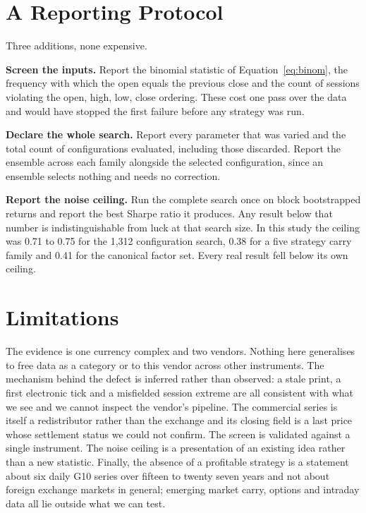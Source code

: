 \documentclass[10pt]{article}
\begin{document}
\section{A Reporting Protocol}\label{sec:protocol}

Three additions, none expensive.

\textbf{Screen the inputs.} Report the binomial statistic of Equation~\eqref{eq:binom}, the
frequency with which the open equals the previous close and the count of sessions
violating the open, high, low, close ordering. These cost one pass over the data and would
have stopped the first failure before any strategy was run.

\textbf{Declare the whole search.} Report every parameter that was varied and the total
count of configurations evaluated, including those discarded. Report the ensemble across
each family alongside the selected configuration, since an ensemble selects nothing and
needs no correction.

\textbf{Report the noise ceiling.} Run the complete search once on block bootstrapped
returns and report the best Sharpe ratio it produces. Any result below that number is
indistinguishable from luck at that search size. In this study the ceiling was 0.71 to 0.75
for the 1,312 configuration search, 0.38 for a five strategy carry family and 0.41 for the
canonical factor set. Every real result fell below its own ceiling.

\section{Limitations}\label{sec:limits}

The evidence is one currency complex and two vendors. Nothing here generalises to free data
as a category or to this vendor across other instruments. The mechanism behind the defect
is inferred rather than observed: a stale print, a first electronic tick and a misfielded
session extreme are all consistent with what we see and we cannot inspect the vendor's
pipeline. The commercial series is itself a redistributor rather than the exchange and its
closing field is a last price whose settlement status we could not confirm. The screen is
validated against a single instrument. The noise ceiling is a presentation of an existing
idea rather than a new statistic. Finally, the absence of a profitable strategy is a
statement about six daily G10 series over fifteen to twenty seven years and not about
foreign exchange markets in general; emerging market carry, options and intraday data all
lie outside what we can test.
\end{document}
